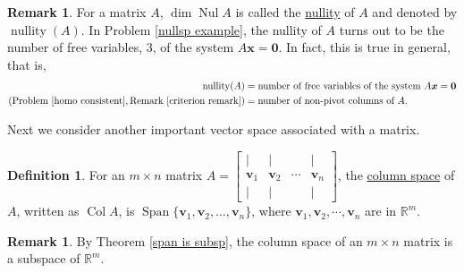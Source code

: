 \documentclass[12pt,letterpaper]{book}
\numberwithin{equation}{section}
\theoremstyle{definition}
\newtheorem{defi}[thm]{\textbf{Definition}}
\newtheorem{remark}[thm]{\textbf{Remark}}
\newcommand{\vv}{\bm{v}}
\newcommand{\vx}{\bm{x}}
\newcommand{\veczero}{\bm{0}}
\newcommand{\Nul}{\operatorname{Nul}}
\newcommand{\Coll}{\operatorname{Col}}
\newcommand{\Span}{\operatorname{Span}}
\newcommand{\nullity}{\operatorname{nullity}}
\begin{document}
\begin{remark}\label{nullity eq nonpivot} For a matrix $A$, $\dim \Nul A$ is called the \underline{nullity} of $A$ and denoted by $\nullity(A)$. In Problem \ref{nullsp example}, the nullity of $A$ turns out to be the number of free variables, $3$, of the system $A\vx=\veczero$. In fact, this is true in general, that is,
\begin{align*}\nullity(A)&=\text{number of free variables of the system }A\vx=\veczero\\
(\text{Problem }\ref{homo consistent}, \text{Remark }\ref{criterion remark})&=\text{number of non-pivot columns of }A.
\end{align*}
\end{remark}

Next we consider another important vector space associated with a matrix.

\begin{defi} For an $m\times n$ matrix $A=\left[\begin{array}{cccc} | & | &   & | \\ \vv_1 & \vv_2 & \cdots & \vv_n \\ | & | &  & |
\end{array}\right]$, the \underline{column space}
of $A$, written as $\Coll A$, is $\Span \{\vv_1,\vv_2,\ldots,
\vv_n\}$, where $\vv_1,\vv_2,\cdots, \vv_n$
are in $\mathbb{R}^m$.
\end{defi}

\begin{remark} By Theorem \ref{span is subsp}, the column space of an $m\times n$ matrix is a
subspace of $\mathbb{R}^m$.
\end{remark}
\end{document}
